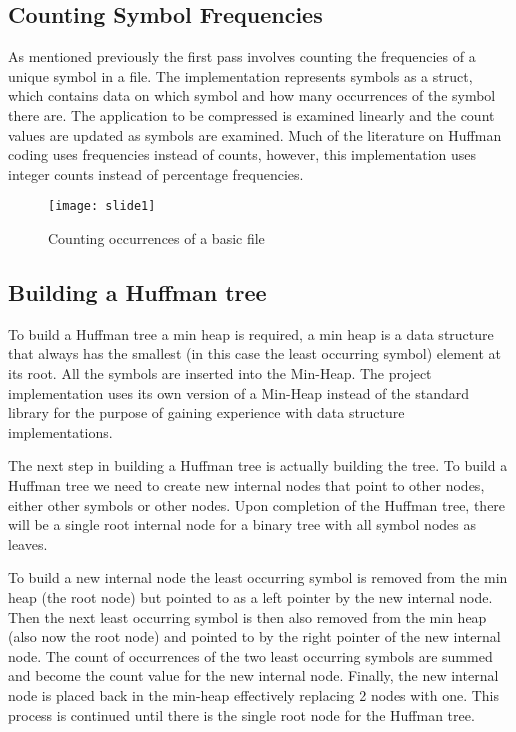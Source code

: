 \doublespacing
\singlespacing
\subsection{Counting Symbol Frequencies}


\singlespacing
As mentioned previously the first pass involves counting the frequencies of a unique symbol in a file. The implementation represents symbols as a struct, which contains data on which symbol and how many occurrences of the symbol there are. The application to be compressed is examined linearly and the count values are updated as symbols are examined. Much of the literature on Huffman coding uses frequencies instead of counts, however, this implementation uses integer counts instead of percentage frequencies.


\begin{figure}[H]
\caption{Counting occurrences of a basic file}
\texttt{[image: slide1]}
\centering
\end{figure}


\subsection{Building a Huffman tree}


\doublespacing
\singlespacing
To build a Huffman tree a min heap is required, a min heap is a data structure that always has the smallest (in this case the least occurring symbol) element at its root. All the symbols are inserted into the Min-Heap. The project implementation uses its own version of a Min-Heap instead of the standard library for the purpose of gaining experience with data structure implementations.


\doublespacing
\singlespacing
The next step in building a Huffman tree is actually building the tree. To build a Huffman tree we need to create new internal nodes that point to other nodes, either other symbols or other nodes. Upon completion of the Huffman tree, there will be a single root internal node for a binary tree with all symbol nodes as leaves.


\doublespacing
\singlespacing
To build a new internal node the least occurring symbol is removed from the min heap (the root node) but pointed to as a left pointer by the new internal node. Then the next least occurring symbol is then also removed from the min heap (also now the root node) and pointed to by the right pointer of the new internal node. The count of occurrences of the two least occurring symbols are summed and become the count value for the new internal node. Finally, the new internal node is placed back in the min-heap effectively replacing 2 nodes with one. This process is continued until there is the single root node for the Huffman tree.


